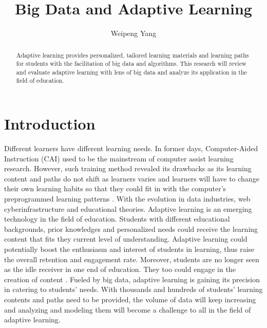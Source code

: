 \documentclass[sigconf]{acmart}
\begin{document}
\title{Big Data and Adaptive Learning}

\author{Weipeng Yang}



\begin{abstract}
Adaptive learning provides personalized, tailored learning materials and learning paths for students with the facilitation of big data and algorithms. This research will review and evaluate adaptive learning with lens of big data and analyze its application in the field of education.
\end{abstract}


\maketitle

\section{Introduction}

Different learners have different learning needs. In former days, Computer-Aided Instruction (CAI) used to be the mainstream of computer assist learning research. However, such training method revealed its drawbacks as its learning content and paths do not shift as learners varies and learners will have to change their own learning habits so that they could fit in with the computer’s preprogrammed learning patterns \cite{Merrill2002}. 
With the evolution in data industries, web cyberinfrastructure and educational theories. Adaptive learning is an emerging technology in the field of education. Students with different educational backgrounds, prior knowledges and personalized needs could receive the learning content that fits they current level of understanding.  Adaptive learning could potentially boost the enthusiasm and interest of students in learning, thus raise the overall retention and engagement rate. Moreover, students are no longer seen as the idle receiver in one end of education. They too could engage in the creation of content \cite{Milhelm1991}.
Fueled by big data, adaptive learning is gaining its precision in catering to students’ needs. With thousands and hundreds of students’ learning contents and paths need to be provided, the volume of data will keep increasing and analyzing and modeling them will become a challenge to all in the field of adaptive learning.
\end{document}
